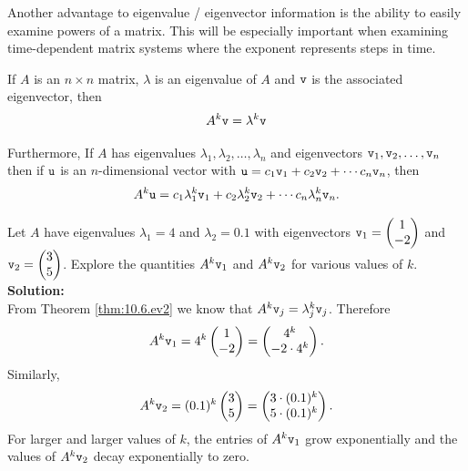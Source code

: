 Another advantage to eigenvalue / eigenvector information is the ability to easily examine
powers of a matrix.  This will be especially important when examining time-dependent
matrix systems where the exponent represents steps in time.
\begin{thm}\label{thm:10.6.ev2}
    If $A$ is an $n \times n$ matrix, $\lambda$ is an eigenvalue of $A$ and $\texttt{v}$ is the
    associated eigenvector, then 
    \[ A^k \texttt{v} = \lambda^k \texttt{v} \]

    Furthermore,
    If $A$ has eigenvalues $\lambda_1, \lambda_2, \ldots, \lambda_n$ and eigenvectors
    $\texttt{v}_1, \texttt{v}_2, \ldots, \texttt{v}_n$ then if $\texttt{u}$ is an $n$-dimensional vector with $\texttt{u} =
    c_1 \texttt{v}_1 + c_2 \texttt{v}_2 + \cdots c_n \texttt{v}_n$, then
    \[ A^k \texttt{u} = c_1 \lambda_1^k \texttt{v}_1 +c_2 \lambda_2^k \texttt{v}_2 + \cdots c_n \lambda_n^k
        \texttt{v}_n. \]
    
\end{thm}

\begin{example}
Let $A$ have eigenvalues $\lambda_1 = 4$ and $\lambda_2 = 0.1$ with eigenvectors $\texttt{v}_1 =
\begin{pmatrix} 1 \\ -2 \end{pmatrix}$ and $\texttt{v}_2 = \begin{pmatrix} 3 \\ 5 \end{pmatrix}$.  Explore the quantities $A^k \texttt{v}_1$ and
$A^k \texttt{v}_2$ for various values of $k$.
\\{\bf Solution:}\\
From Theorem \ref{thm:10.6.ev2} we know that $A^k \texttt{v}_j = \lambda_j^k \texttt{v}_j$.  Therefore
\[ A^k \texttt{v}_1 = 4^k \begin{pmatrix} 1 \\ -2 \end{pmatrix} = \begin{pmatrix} 4^k \\ -2 \cdot 4^k \end{pmatrix}. \]
Similarly,
\[ A^k \texttt{v}_2 = (0.1)^k \begin{pmatrix} 3 \\ 5 \end{pmatrix} = \begin{pmatrix} 3 \cdot (0.1)^k \\ 5 \cdot (0.1)^k \end{pmatrix}. \]
For larger and larger values of $k$, the entries of $A^k \texttt{v}_1$ grow exponentially and the
values of $A^k \texttt{v}_2$ decay exponentially to zero.
\end{example}

